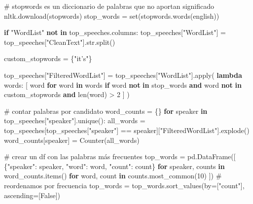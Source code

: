\documentclass[
  letterpaper,
  DIV=11,
  numbers=noendperiod]{scrartcl}
\newenvironment{Shaded}{\begin{snugshade}}{\end{snugshade}}
\newcommand{\BuiltInTok}[1]{\textcolor[rgb]{0.00,0.23,0.31}{#1}}
\newcommand{\CommentTok}[1]{\textcolor[rgb]{0.37,0.37,0.37}{#1}}
\newcommand{\ControlFlowTok}[1]{\textcolor[rgb]{0.00,0.23,0.31}{\textbf{#1}}}
\newcommand{\DecValTok}[1]{\textcolor[rgb]{0.68,0.00,0.00}{#1}}
\newcommand{\KeywordTok}[1]{\textcolor[rgb]{0.00,0.23,0.31}{\textbf{#1}}}
\newcommand{\NormalTok}[1]{\textcolor[rgb]{0.00,0.23,0.31}{#1}}
\newcommand{\OperatorTok}[1]{\textcolor[rgb]{0.37,0.37,0.37}{#1}}
\newcommand{\StringTok}[1]{\textcolor[rgb]{0.13,0.47,0.30}{#1}}
\newcommand{\VariableTok}[1]{\textcolor[rgb]{0.07,0.07,0.07}{#1}}
\begin{document}
\begin{Shaded}
\begin{Highlighting}[]
\CommentTok{\# stopwords es un diccionario de palabras que no aportan significado}
\NormalTok{nltk.download(}\StringTok{\textquotesingle{}stopwords\textquotesingle{}}\NormalTok{)}
\NormalTok{stop\_words }\OperatorTok{=} \BuiltInTok{set}\NormalTok{(stopwords.words(}\StringTok{\textquotesingle{}english\textquotesingle{}}\NormalTok{))}

\ControlFlowTok{if} \StringTok{"WordList"} \KeywordTok{not} \KeywordTok{in}\NormalTok{ top\_speeches.columns:}
\NormalTok{    top\_speeches[}\StringTok{"WordList"}\NormalTok{] }\OperatorTok{=}\NormalTok{ top\_speeches[}\StringTok{"CleanText"}\NormalTok{].}\BuiltInTok{str}\NormalTok{.split()}

\NormalTok{custom\_stopwords }\OperatorTok{=}\NormalTok{ \{}\StringTok{"it’s"}\NormalTok{\}}

\NormalTok{top\_speeches[}\StringTok{"FilteredWordList"}\NormalTok{] }\OperatorTok{=}\NormalTok{ top\_speeches[}\StringTok{"WordList"}\NormalTok{].}\BuiltInTok{apply}\NormalTok{(}
    \KeywordTok{lambda}\NormalTok{ words: [}
\NormalTok{        word }\ControlFlowTok{for}\NormalTok{ word }\KeywordTok{in}\NormalTok{ words }
        \ControlFlowTok{if}\NormalTok{ word }\KeywordTok{not} \KeywordTok{in}\NormalTok{ stop\_words }\KeywordTok{and}\NormalTok{ word }\KeywordTok{not} \KeywordTok{in}\NormalTok{ custom\_stopwords }\KeywordTok{and} \BuiltInTok{len}\NormalTok{(word) }\OperatorTok{\textgreater{}} \DecValTok{2}
\NormalTok{    ]}
\NormalTok{)}

\CommentTok{\# contar palabras por candidato}
\NormalTok{word\_counts }\OperatorTok{=}\NormalTok{ \{\}}
\ControlFlowTok{for}\NormalTok{ speaker }\KeywordTok{in}\NormalTok{ top\_speeches[}\StringTok{"speaker"}\NormalTok{].unique():}
\NormalTok{    all\_words }\OperatorTok{=}\NormalTok{ top\_speeches[top\_speeches[}\StringTok{"speaker"}\NormalTok{] }\OperatorTok{==}\NormalTok{ speaker][}\StringTok{"FilteredWordList"}\NormalTok{].explode()}
\NormalTok{    word\_counts[speaker] }\OperatorTok{=}\NormalTok{ Counter(all\_words)}

\CommentTok{\# crear un df con las palabras más frecuentes}
\NormalTok{top\_words }\OperatorTok{=}\NormalTok{ pd.DataFrame([}
\NormalTok{    \{}\StringTok{"speaker"}\NormalTok{: speaker, }\StringTok{"word"}\NormalTok{: word, }\StringTok{"count"}\NormalTok{: count\}}
    \ControlFlowTok{for}\NormalTok{ speaker, counts }\KeywordTok{in}\NormalTok{ word\_counts.items()}
    \ControlFlowTok{for}\NormalTok{ word, count }\KeywordTok{in}\NormalTok{ counts.most\_common(}\DecValTok{10}\NormalTok{)}
\NormalTok{])}
\CommentTok{\# reordenamos por frecuencia}
\NormalTok{top\_words }\OperatorTok{=}\NormalTok{ top\_words.sort\_values(by}\OperatorTok{=}\NormalTok{[}\StringTok{"count"}\NormalTok{], ascending}\OperatorTok{=}\NormalTok{[}\VariableTok{False}\NormalTok{])}


\end{Highlighting}
\end{Shaded}
\end{document}
